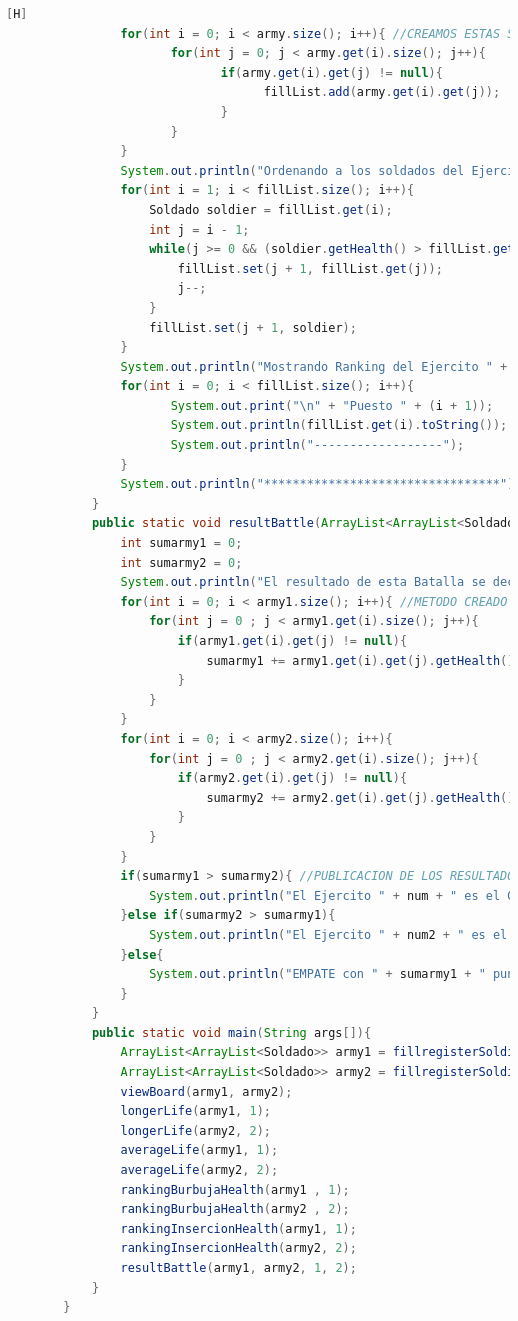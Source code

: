 \documentclass{article}
\begin{document}
\begin{lstlisting}[language=java,caption={Las lineas de codigo :}][H]
				for(int i = 0; i < army.size(); i++){ //CREAMOS ESTAS SENTENCIAS PARA PODER VERIFICAR EL NUMERO DE SOLDADOS Y TAMBIEN ANADIRLO EN EL ARRAYLIST CREADO PARA DESPUES PONER EL RANKING DE PUESTOS DE CADA UNO DE ESTOS SOLDADOS
					   for(int j = 0; j < army.get(i).size(); j++){
							  if(army.get(i).get(j) != null){
									fillList.add(army.get(i).get(j));
							  }
					   }
				}
				System.out.println("Ordenando a los soldados del Ejercito " + num + " por el insercion: "); //APLICAMOS EL METODO INSERCION CON LOS PUNTOS DE VIDA
				for(int i = 1; i < fillList.size(); i++){
					Soldado soldier = fillList.get(i);
					int j = i - 1;
					while(j >= 0 && (soldier.getHealth() > fillList.get(j).getHealth())){ //APLICAMOS EL METODO INSERCION
						fillList.set(j + 1, fillList.get(j));
						j--;
					}
					fillList.set(j + 1, soldier);
				}
				System.out.println("Mostrando Ranking del Ejercito " + num + "....."); //MOSTRADOR DE RANKING DE LOS SOLDADOS
				for(int i = 0; i < fillList.size(); i++){
					   System.out.print("\n" + "Puesto " + (i + 1));
					   System.out.println(fillList.get(i).toString()); //DAMOS A CONOCER SUS DATOS Y EL PUESTO EN EL RANKING
					   System.out.println("------------------");
				}
				System.out.println("*********************************");
			}
			public static void resultBattle(ArrayList<ArrayList<Soldado>> army1, ArrayList<ArrayList<Soldado>> army2, int num, int num2){
				int sumarmy1 = 0;
				int sumarmy2 = 0;
				System.out.println("El resultado de esta Batalla se decidio por el nivel de fuerza de cada ejercito por lo que el resultado es: ...");
				for(int i = 0; i < army1.size(); i++){ //METODO CREADO QUE NOS PERMITE DAR CON UN GANADOR ESTO GRACIAS AL NIVEL DE PUNTOS DE VIDA O FUERZA DE CADA EJERCITO EL CUAL VAMOS SUMANDO DE CADA EJERCITO PARA DESPUES COMPARARLOS Y DECIDIR EL RESULTADO DE ESTA BATALLA
					for(int j = 0 ; j < army1.get(i).size(); j++){
						if(army1.get(i).get(j) != null){
							sumarmy1 += army1.get(i).get(j).getHealth(); //SUMA DE PUNTOS DEL EJERCITO 1
						}
					}
				}
				for(int i = 0; i < army2.size(); i++){
					for(int j = 0 ; j < army2.get(i).size(); j++){
						if(army2.get(i).get(j) != null){
							sumarmy2 += army2.get(i).get(j).getHealth(); //SUMA DE PUNTOS DEL EJERCITO 2
						}
					}
				}
				if(sumarmy1 > sumarmy2){ //PUBLICACION DE LOS RESULTADOS
					System.out.println("El Ejercito " + num + " es el GANADOR con " + sumarmy1 + " puntos");
				}else if(sumarmy2 > sumarmy1){
					System.out.println("El Ejercito " + num2 + " es el GANADOR con " + sumarmy2 + " puntos");
				}else{
					System.out.println("EMPATE con " + sumarmy1 + " puntos");
				}
			}
			public static void main(String args[]){
				ArrayList<ArrayList<Soldado>> army1 = fillregisterSoldiers(1);
				ArrayList<ArrayList<Soldado>> army2 = fillregisterSoldiers(2);
				viewBoard(army1, army2);
				longerLife(army1, 1);
				longerLife(army2, 2);
				averageLife(army1, 1);
				averageLife(army2, 2);
				rankingBurbujaHealth(army1 , 1);
				rankingBurbujaHealth(army2 , 2);    
				rankingInsercionHealth(army1, 1);
				rankingInsercionHealth(army2, 2);
				resultBattle(army1, army2, 1, 2);
			}
		}
	\end{lstlisting}
\end{document}
